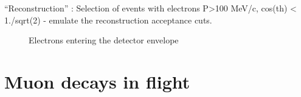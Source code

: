\documentclass[12pt]{article}
\begin{document}
``Reconstruction'' : Selection of events with electrons P>100 MeV/c, cos(th) < 1./sqrt(2) - emulate
the reconstruction acceptance cuts.
\begin{figure}[H]
  \hspace{-0.8in}
  \caption{
    \label{fig:bmum0s58b0_crt_vs_mom}
    Electrons entering the detector envelope
  }
\end{figure}


\section {Muon decays in flight}
\end{document}

